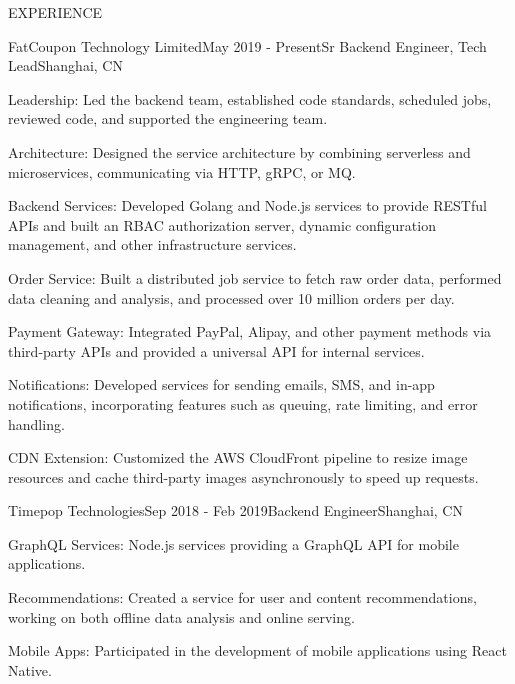 \documentclass{resume} %
\begin{document}
\begin{rSection}{EXPERIENCE}

  \begin{rSubsection}{FatCoupon Technology Limited}{May 2019 - Present}{Sr Backend Engineer, Tech Lead}{Shanghai, CN}
    \item Leadership: Led the backend team, established code standards, scheduled jobs, reviewed code, and supported the engineering team.
    \item Architecture: Designed the service architecture by combining serverless and microservices, communicating via HTTP, gRPC, or MQ.
    \item Backend Services: Developed Golang and Node.js services to provide RESTful APIs and built an RBAC authorization server, dynamic configuration management, and other infrastructure services.
    \item Order Service: Built a distributed job service to fetch raw order data, performed data cleaning and analysis, and processed over 10 million orders per day.
    \item Payment Gateway: Integrated PayPal, Alipay, and other payment methods via third-party APIs and provided a universal API for internal services.
    \item Notifications: Developed services for sending emails, SMS, and in-app notifications, incorporating features such as queuing, rate limiting, and error handling.
    \item CDN Extension: Customized the AWS CloudFront pipeline to resize image resources and cache third-party images asynchronously to speed up requests.
  \end{rSubsection}

  \begin{rSubsection}{Timepop Technologies}{Sep 2018 - Feb 2019}{Backend Engineer}{Shanghai, CN}
    \item GraphQL Services: Node.js services providing a GraphQL API for mobile applications.
    \item Recommendations: Created a service for user and content recommendations, working on both offline data analysis and online serving.
    \item Mobile Apps: Participated in the development of mobile applications using React Native.
  \end{rSubsection}


\end{rSection}
\end{document}
